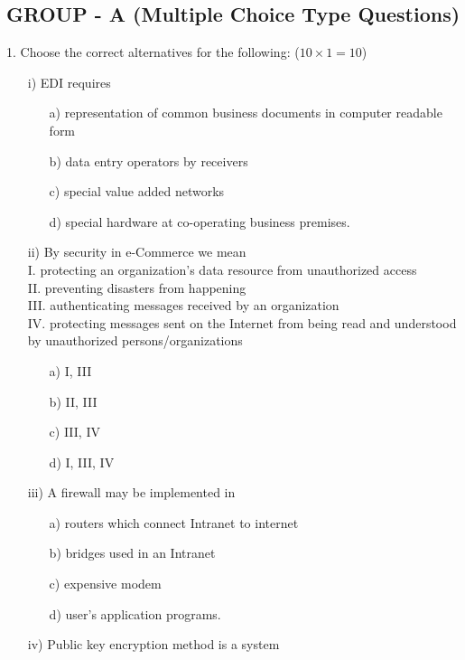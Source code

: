 \subsection*{GROUP - A (Multiple Choice Type Questions)}
1. Choose the correct alternatives for the following: ($10 \times 1 = 10$)
\begin{enumerate}
    \item[i)] EDI requires
    \begin{enumerate}
        \item[a)] representation of common business documents in computer readable form
        \item[b)] data entry operators by receivers
        \item[c)] special value added networks
        \item[d)] special hardware at co-operating business premises.
    \end{enumerate}
    \item[ii)] By security in e-Commerce we mean \\
    I. protecting an organization's data resource from unauthorized access \\
    II. preventing disasters from happening \\
    III. authenticating messages received by an organization \\
    IV. protecting messages sent on the Internet from being read and understood by unauthorized persons/organizations
    \begin{enumerate}
        \item[a)] I, III
        \item[b)] II, III
        \item[c)] III, IV
        \item[d)] I, III, IV
    \end{enumerate}
    \item[iii)] A firewall may be implemented in
    \begin{enumerate}
        \item[a)] routers which connect Intranet to internet
        \item[b)] bridges used in an Intranet
        \item[c)] expensive modem
        \item[d)] user's application programs.
    \end{enumerate}
    \item[iv)] Public key encryption method is a system
    \begin{enumerate}

\end{enumerate}
\end{enumerate}

